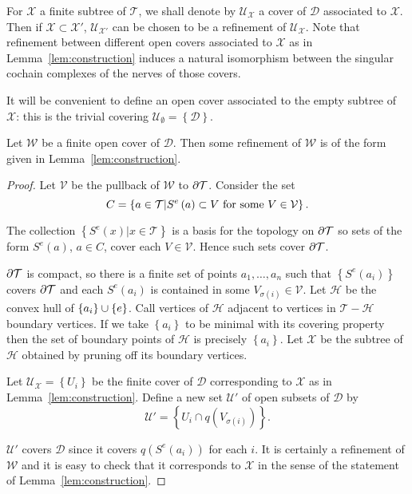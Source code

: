 For $\mathcal{X}$ a finite subtree of $\mathcal{T}$, we shall denote by
$\mathcal{U}_\mathcal{X}$ a cover of $\mathcal{D}$ associated to
$\mathcal{X}$. Then if $\mathcal{X} \subset \mathcal{X}'$,
$\mathcal{U}_{\mathcal{X}'}$ can be chosen to be a refinement of
$\mathcal{U}_\mathcal{X}$. Note that refinement between different open covers
associated to $\mathcal{X}$ as in Lemma~\ref{lem:construction} induces a
natural isomorphism between the singular cochain complexes of the nerves of
those covers.

It will be convenient to define an open cover associated to the empty subtree
of $\mathcal{X}$: this is the trivial covering $\mathcal{U}_\emptyset =
\left\{\mathcal{D}\right\}$. 

\begin{lem}\label{lem:refining} Let $\mathcal{W}$ be a finite open cover of
$\mathcal{D}$.  Then some refinement of $\mathcal{W}$ is of the form given
in Lemma~\ref{lem:construction}.
\end{lem}
\begin{proof}
Let $\mathcal{V}$ be the pullback of $\mathcal{W}$ to
$\partial\mathcal{T}$. Consider the set
\begin{equation}
C = \left\{a \in \mathcal{T} \vert S^e\left(a\right)
  \subset V \text{ for some } V \in \mathcal{V}\right\}\textup{.}
\end{equation}

The collection $\left\{S^e\left(x\right) \vert x \in \mathcal{T}\right\}$ is
a basis for the topology on $\partial\mathcal{T}$ so sets of the form
$S^e\left(a\right)$, $a\in C$, cover each $V \in \mathcal{V}$. Hence such
sets cover $\partial\mathcal{T}$.

$\partial\mathcal{T}$ is compact, so there is a finite set of points $a_1,
\dots , a_n$ such that $\left\{S^e\left(a_i\right) \right\}$ covers
$\partial\mathcal{T}$ and each $S^e \left(a_i\right)$ is contained in some
$V_{\sigma\left(i\right)} \in \mathcal{V}$. Let $\mathcal{H}$ be the convex
hull of $\left\{a_i\right\} \cup \left\{e\right\}$. Call vertices of
$\mathcal{H}$ adjacent to vertices in $\mathcal{T} - \mathcal{H}$ boundary
vertices. If we take $\left\{a_i\right\}$ to be minimal with its covering
property then the set of boundary points of $\mathcal{H}$ is precisely
$\left\{a_i\right\}$.  Let $\mathcal{X}$ be the subtree of $\mathcal{H}$
obtained by pruning off its boundary vertices.

Let $\mathcal{U}_\mathcal{X} = \left\{U_i\right\}$ be the finite cover of
$\mathcal{D}$ corresponding to $\mathcal{X}$ as in
Lemma~\ref{lem:construction}.  Define a new set $\mathcal{U}'$ of open
subsets of $\mathcal{D}$ by 
\begin{equation}
\mathcal{U}' = \left\{U_i \cap q\left(V_{\sigma\left(i\right)}\right)\right\}
  \text{.}
\end{equation}

$\mathcal{U'}$ covers $\mathcal{D}$ since it covers
$q\left(S^e\left(a_i\right)\right)$ for each $i$. It
is certainly a refinement of $\mathcal{W}$ and it is easy to check that it
corresponds to $\mathcal{X}$ in the sense of the statement of
Lemma~\ref{lem:construction}.
\end{proof}

